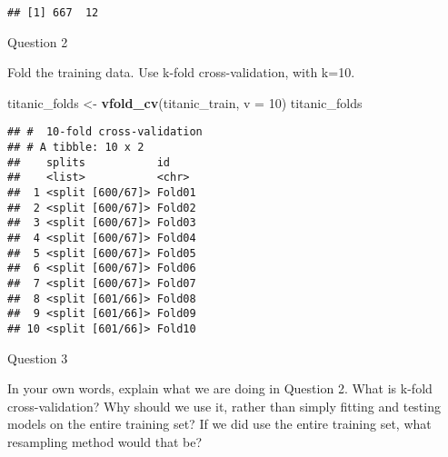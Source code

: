 \documentclass[]{article}
\newenvironment{Shaded}{\begin{snugshade}}{\end{snugshade}}
\newcommand{\DataTypeTok}[1]{\textcolor[rgb]{0.13,0.29,0.53}{#1}}
\newcommand{\DecValTok}[1]{\textcolor[rgb]{0.00,0.00,0.81}{#1}}
\newcommand{\KeywordTok}[1]{\textcolor[rgb]{0.13,0.29,0.53}{\textbf{#1}}}
\newcommand{\NormalTok}[1]{#1}
\newcommand{\OperatorTok}[1]{\textcolor[rgb]{0.81,0.36,0.00}{\textbf{#1}}}
\newcommand{\StringTok}[1]{\textcolor[rgb]{0.31,0.60,0.02}{#1}}
\begin{document}
\begin{verbatim}
## [1] 667  12
\end{verbatim}

\begin{Shaded}
\end{Shaded}

Question 2

Fold the training data. Use k-fold cross-validation, with k=10.

\begin{Shaded}
\begin{Highlighting}[]
\NormalTok{titanic_folds <-}\StringTok{ }\KeywordTok{vfold_cv}\NormalTok{(titanic_train, }\DataTypeTok{v =} \DecValTok{10}\NormalTok{)}
\NormalTok{titanic_folds}
\end{Highlighting}
\end{Shaded}

\begin{verbatim}
## #  10-fold cross-validation 
## # A tibble: 10 x 2
##    splits           id    
##    <list>           <chr> 
##  1 <split [600/67]> Fold01
##  2 <split [600/67]> Fold02
##  3 <split [600/67]> Fold03
##  4 <split [600/67]> Fold04
##  5 <split [600/67]> Fold05
##  6 <split [600/67]> Fold06
##  7 <split [600/67]> Fold07
##  8 <split [601/66]> Fold08
##  9 <split [601/66]> Fold09
## 10 <split [601/66]> Fold10
\end{verbatim}

Question 3

In your own words, explain what we are doing in Question 2. What is
k-fold cross-validation? Why should we use it, rather than simply
fitting and testing models on the entire training set? If we did use the
entire training set, what resampling method would that be?
\end{document}
